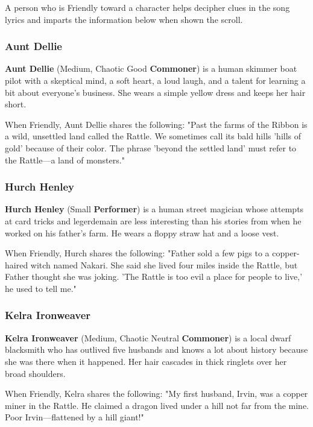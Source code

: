 \documentclass[letterpaper, 11pt, twocolumn]{dndbook}
\begin{document}
A person who is Friendly toward a character helps decipher clues in the song lyrics and imparts the information below when shown the scroll.

\subsubsection{Aunt Dellie}

\textbf{Aunt Dellie} (Medium, Chaotic Good \textbf{Commoner}) is a human skimmer boat pilot with a skeptical mind, a soft heart, a loud laugh, and a talent for learning a bit about everyone's business. She wears a simple yellow dress and keeps her hair short.

When Friendly, Aunt Dellie shares the following: "Past the farms of the Ribbon is a wild, unsettled land called the Rattle. We sometimes call its bald hills 'hills of gold' because of their color. The phrase 'beyond the settled land' must refer to the Rattle---a land of monsters."

\subsubsection{Hurch Henley}

\textbf{Hurch Henley} (Small \textbf{Performer}) is a human street magician whose attempts at card tricks and legerdemain are less interesting than his stories from when he worked on his father's farm. He wears a floppy straw hat and a loose vest.

When Friendly, Hurch shares the following: "Father sold a few pigs to a copper-haired witch named Nakari. She said she lived four miles inside the Rattle, but Father thought she was joking. 'The Rattle is too evil a place for people to live,' he used to tell me."

\subsubsection{Kelra Ironweaver}

\textbf{Kelra Ironweaver} (Medium, Chaotic Neutral \textbf{Commoner}) is a local dwarf blacksmith who has outlived five husbands and knows a lot about history because she was there when it happened. Her hair cascades in thick ringlets over her broad shoulders.

When Friendly, Kelra shares the following: "My first husband, Irvin, was a copper miner in the Rattle. He claimed a dragon lived under a hill not far from the mine. Poor Irvin---flattened by a hill giant!"
\end{document}
